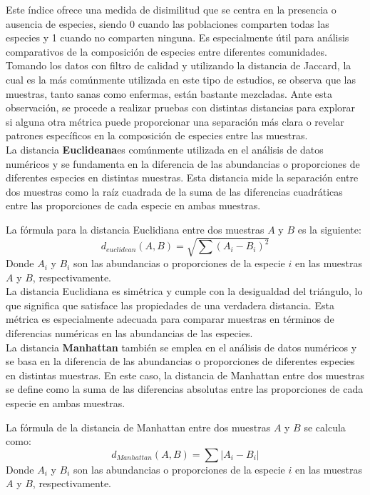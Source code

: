 Este índice ofrece una medida de disimilitud que se centra en la presencia o ausencia de especies, siendo 0 cuando las poblaciones comparten todas las especies y 1 cuando no comparten ninguna. Es especialmente útil para análisis comparativos de la composición de especies entre diferentes comunidades.\\

Tomando los datos con filtro de calidad y utilizando la distancia de Jaccard, la cual es la más comúnmente utilizada en este tipo de estudios, se observa que las muestras, tanto sanas como enfermas, están bastante mezcladas. Ante esta observación, se procede a realizar pruebas con distintas distancias para explorar si alguna otra métrica puede proporcionar una separación más clara o revelar patrones específicos en la composición de especies entre las muestras.\\

La distancia \textbf{Euclideana}es comúnmente utilizada en el análisis de datos numéricos y se fundamenta en la diferencia de las abundancias o proporciones de diferentes especies en distintas muestras. Esta distancia mide la separación entre dos muestras como la raíz cuadrada de la suma de las diferencias cuadráticas entre las proporciones de cada especie en ambas muestras.

La fórmula para la distancia Euclidiana entre dos muestras $A$ y $B$ es la siguiente:
$$d_{euclidean} (A,B) = \sqrt{\sum(A_i - B_i)^2}$$
Donde $A_i$ y $B_i$ son las abundancias o proporciones de la especie $i$ en las muestras $A$ y $B$, respectivamente.\\

La distancia Euclidiana es simétrica y cumple con la desigualdad del triángulo, lo que significa que satisface las propiedades de una verdadera distancia. Esta métrica es especialmente adecuada para comparar muestras en términos de diferencias numéricas en las abundancias de las especies.\\

La distancia \textbf{Manhattan} también se emplea en el análisis de datos numéricos y se basa en la diferencia de las abundancias o proporciones de diferentes especies en distintas muestras. En este caso, la distancia de Manhattan entre dos muestras se define como la suma de las diferencias absolutas entre las proporciones de cada especie en ambas muestras.

La fórmula de la distancia de Manhattan entre dos muestras $A$ y $B$ se calcula como:
$$d_{Manhattan}(A, B) = \sum{|A_i - B_i|}$$
Donde $A_i$ y $B_i$ son las abundancias o proporciones de la especie $i$ en las muestras $A$ y $B$, respectivamente. \\

